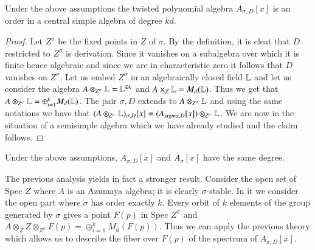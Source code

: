 \begin{theorem*}
Under the above assumptions the twisted polynomial algebra $A_{\sigma, D}[x]$ is an order in a central simple algebra of degree $kd$.
\end{theorem*}

\begin{proof}
Let $Z^{\sigma}$ be the fixed points in $Z$ of $\sigma$. By the definition, it is cleat that $D$ restricted to $Z^{\sigma}$ is derivation. Since it vanishes on a subalgebra over which it is finite hence algebraic and since we are in characteristic zero it follows that $D$ vanishes on $Z^{\sigma}$. Let us embed $Z^{\sigma}$ in an algebraically closed field $\mathbb{L}$ and let us consider the algebra $A\otimes_{Z^{\sigma}}\mathbb{L} = \mathbb{L}^{\oplus k}$ and $A \times_{Z}\mathbb{L} = M_{d}(\mathbb{L})$. Thus we get that $A\otimes_{Z^{\sigma}}\mathbb{L}=\oplus_{i=1}^{k}M_{d}(\mathbb{L})$. The pair $\sigma, D$ extends to $A\otimes_{Z^{\sigma}}\mathbb{L}$ and using the same notations we have that $(A\otimes_{Z^{\sigma}}\mathbb{L})_{\sigma, D}[x] = (A_{sigma, D}[x])\otimes_{Z^{\sigma}} \mathbb{L}$. We are now in the situation of a semisimple algebra which we have already studied and the claim follows.
\end{proof}

\begin{coro*}
Under the above assumptions, $A_{\sigma, D}[x]$ and $A_{\sigma}[x]$ have the same degree.
\end{coro*}

\begin{remark*}
The previous analysis yields in fact a stronger result. Consider the open set of Spec $Z$ where $A$ is an Azumaya algebra; it is clearly $\sigma$-stable. In it we consider the open part where $\sigma $ has order exactly $k$. Every orbit of $k$ elements of the group generated by $\sigma$ gives a point $F(p)$ in Spec $Z^{\sigma}$ and $A\otimes_{Z}Z\otimes _{Z^{\sigma}}F(p) = \oplus_{i=1}^{k}M_{d}(F(p))$. Thus we can apply the previous theory which allows us to describe the fiber over $F(p)$ of the spectrum of $A_{\sigma, D}[x]$.
\end{remark*}

